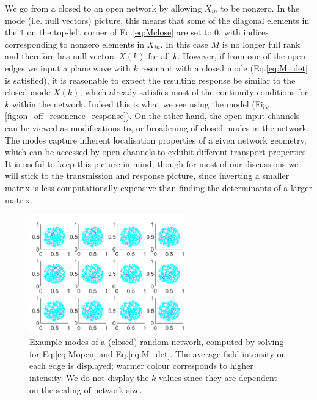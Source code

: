 We go from a closed to an open network by allowing $X_{in}$ to be nonzero. In the mode (i.e. null vectors) picture, this means that some of the diagonal elements in the $\mathbb{1}$ on the top-left corner of Eq.\ref{eq:Mclose} are set to $0$, with indices corresponding to nonzero elements in $X_{in}$. In this case $M$ is no longer full rank and therefore has null vectors $X(k)$ for all $k$. However, if from one of the open edges we input a plane wave with $k$ resonant with a closed mode (Eq.\ref{eq:M_det} is satisfied), it is reasonable to expect the resulting response be similar to the closed mode $X(k)$, which already satisfies most of the continuity conditions for $k$ within the network. Indeed this is what we see using the model (Fig.\ref{fig:on_off_resonence_response}). On the other hand, the open input channels can be viewed as modifications to, or broadening of closed modes in the network. The modes capture inherent localisation properties of a given network geometry, which can be accessed by open channels to exhibit different transport properties. It is useful to keep this picture in mind, though for most of our discussions we will stick to the transmission and response picture, since inverting a smaller matrix is less computationally expensive than finding the determinants of a larger matrix. 
\begin{figure}[h]
  \centering
    \includegraphics[width=0.6\textwidth]{ch2/fig2/randnet_passive_modes_examples.png}
    \caption{Example modes of a (closed) random network, computed by solving for Eq.\ref{eq:Mopen} and Eq.\ref{eq:M_det}. The average field intensity on each edge is displayed; warmer colour corresponds to higher intensity. We do not display the $k$ values since they are dependent on the scaling of network size. }
    \label{fig:closed_mode_examples}
\end{figure}
